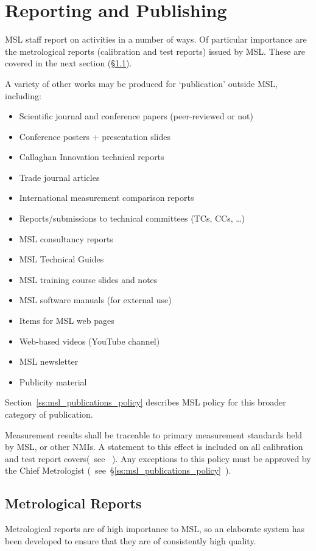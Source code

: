 \section{Reporting and Publishing}
MSL staff report on activities in a number of ways. Of particular importance are the metrological reports (calibration and test reports) issued by MSL. These are covered in the next section (\S\ref{ss:metrological_reports}). 

A variety of other works may be produced for `publication' outside MSL, including:
\begin{itemize}
\item Scientific journal and conference papers (peer-reviewed or not)
\item Conference posters + presentation slides
\item Callaghan Innovation technical reports
\item Trade journal articles
\item International measurement comparison reports
\item Reports/submissions to technical committees (TCs, CCs, …)
\item MSL consultancy reports
\item MSL Technical Guides
\item MSL training course slides and notes
\item MSL software manuals (for external use)
\item Items for MSL web pages
\item Web-based videos (YouTube channel)   
\item MSL newsletter
\item Publicity material
\end{itemize}

Section~\ref{ss:msl_publications_policy} describes MSL policy for this broader category of publication.

Measurement results shall be traceable to primary measurement standards held by MSL, or other NMIs. A statement to this effect is included on all calibration and test report covers(~see  \cite[\S\ref*{GRP-ss:report_covers}]{MSL_Reporting_Guidelines}~). Any exceptions to this policy must be approved by the Chief Metrologist (~see~\S\ref{ss:msl_publications_policy}~).

\subsection{Metrological Reports}
\label{ss:metrological_reports}
Metrological reports are of high importance to MSL, so an elaborate system has been developed to ensure that they are of consistently high quality.

